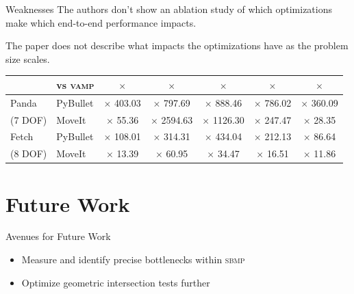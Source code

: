 \documentclass{beamer}
\begin{document}
\begin{frame}{Weaknesses}
The authors don't show an ablation study of which optimizations make which end-to-end performance impacts.
\vspace{5px}\pause

The paper does not describe what impacts the optimizations have as the problem size scales. 

\begin{table}[width=0.8\textwidth]

\centering
  \begin{tabular}{ll*{5}{@{\hspace{4pt}} >{$\times$} S}}
  \toprule
        & vs \textsc{vamp} &  &  &  &  &  \\
  \midrule
  Panda & PyBullet & 403.03 & 797.69  & 888.46   & 786.02 & 360.09 \\
  (7 DOF) & MoveIt  & 55.36  & 2594.63 & 1126.30  & 247.47 & 28.35  \\
  \midrule
  Fetch & PyBullet & 108.01 & 314.31  & 434.04   & 212.13 & 86.64  \\
  (8 DOF) & MoveIt   & 13.39  & 60.95   & 34.47    & 16.51  & 11.86  \\
  \bottomrule
\end{tabular}
\end{table}

\end{frame}

\section{Future Work}

\begin{frame}{Avenues for Future Work}
\begin{itemize}
\item Measure and identify precise bottlenecks within \textsc{sbmp}
\item Optimize geometric intersection tests further
\end{itemize}

\end{frame}
\end{document}
